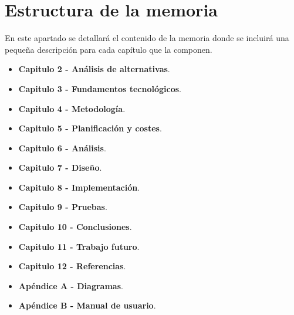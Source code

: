 \section{Estructura de la memoria}
En este apartado se detallará el contenido de la memoria donde se incluirá una pequeña descripción para cada capítulo que la componen.

\begin{itemize}
	\item \textbf{Capitulo 2 - Análisis de alternativas}. 
	\item \textbf{Capitulo 3 - Fundamentos tecnológicos}. 
	\item \textbf{Capitulo 4 - Metodología}. 	
	\item \textbf{Capitulo 5 - Planificación y costes}. 
	\item \textbf{Capitulo 6 - Análisis}. 
	\item \textbf{Capitulo 7 - Diseño}. 
	\item \textbf{Capitulo 8 - Implementación}. 
	\item \textbf{Capitulo 9 - Pruebas}. 
	\item \textbf{Capitulo 10 - Conclusiones}. 
	\item \textbf{Capitulo 11 - Trabajo futuro}. 
	\item \textbf{Capitulo 12 - Referencias}. 
	\item \textbf{Apéndice A - Diagramas}.
	\item \textbf{Apéndice B - Manual de usuario}.  
\end{itemize}


















